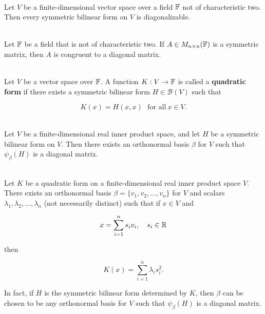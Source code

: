 \begin{theorem}
	\hfill\\
	Let $V$ be a finite-dimensional vector space over a field $\mathbb{F}$ not of characteristic two. Then every symmetric bilinear form on $V$ is diagonalizable.
\end{theorem}

\begin{corollary}
	\hfill\\
	Let $\mathbb{F}$ be a field that is not of characteristic two. If $A \in M_{n \times n}(\mathbb{F})$ is a symmetric matrix, then $A$ is congruent to a diagonal matrix.
\end{corollary}

\begin{definition}
	\hfill\\
	Let $V$ be a vector space over $\mathbb{F}$. A function $K: V \to \mathbb{F}$ is called a \textbf{quadratic form} if there exists a symmetric bilinear form $H \in \mathcal{B}(V)$ such that

	\[K(x) = H(x, x)\ \ \ \text{for all}\ x \in V.\]
\end{definition}

\begin{theorem}
	\hfill\\
	Let $V$ be a finite-dimensional real inner product space, and let $H$ be a symmetric bilinear form on $V$. Then there exists an orthonormal basis $\beta$ for $V$ such that $\psi_\beta(H)$ is a diagonal matrix.
\end{theorem}

\begin{corollary}
	\hfill\\
	Let $K$ be a quadratic form on a finite-dimensional real inner product space $V$. There exists an orthonormal basis $\beta = \{v_1, v_2, \dots, v_n\}$ for $V$ and scalars $\lambda_1, \lambda_2, \dots, \lambda_n$ (not necessarily distinct) such that if $x \in V$ and

	\[x = \sum_{i=1}^{n}s_iv_i,\ \ \ s_i \in \mathbb{R}\]

	then

	\[K(x) = \sum_{i=1}^{n}\lambda_is_i^2.\]

	In fact, if $H$ is the symmetric bilinear form determined by $K$, then $\beta$ can be chosen to be any orthonormal basis for $V$ such that $\psi_\beta(H)$ is a diagonal matrix.
\end{corollary}

